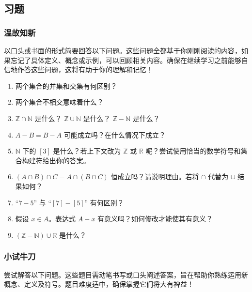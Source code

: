 \subsection{习题}

\subsubsection*{温故知新}

以口头或书面的形式简要回答以下问题。这些问题全都基于你刚刚阅读的内容，如果忘记了具体定义、概念或示例，可以回顾相关内容。确保在继续学习之前能够自信地作答这些问题，这将有助于你的理解和记忆！

\begin{enumerate}[label=(\arabic*)]
    \item 两个集合的并集和交集有何区别？
    \item 两个集合不相交意味着什么？
    \item $\mathbb{Z} \cap \mathbb{N}$ 是什么？ $\mathbb{Z} \cup \mathbb{N}$ 是什么？ $\mathbb{Z}-\mathbb{N}$ 是什么？
    \item $A - B = B - A$ 可能成立吗？在什么情况下成立？
    \item $\mathbb{N}$ 下的 $\overline{[3]}$ 是什么？若上下文改为 $\mathbb{Z}$ 或 $\mathbb{R}$ 呢？尝试使用恰当的数学符号和集合构建符给出你的答案。
    \item $(A \cap B) \cap C = A \cap (B \cap C)$ 恒成立吗？请说明理由。若将 $\cap$ 代替为 $\cup$ 结果如何？
    \item ``$7-5$'' 与 ``$[7]-[5]$'' 有何区别？
    \item 假设 $x \in A$。表达式 $A - x$ 有意义吗？如何修改才能使其有意义？
    \item $(\mathbb{Z} - \mathbb{N}) \cup \mathbb{R}$ 是什么？
\end{enumerate}

\subsubsection*{小试牛刀}

尝试解答以下问题。这些题目需动笔书写或口头阐述答案，旨在帮助你熟练运用新概念、定义及符号。题目难度适中，确保掌握它们将大有裨益！

